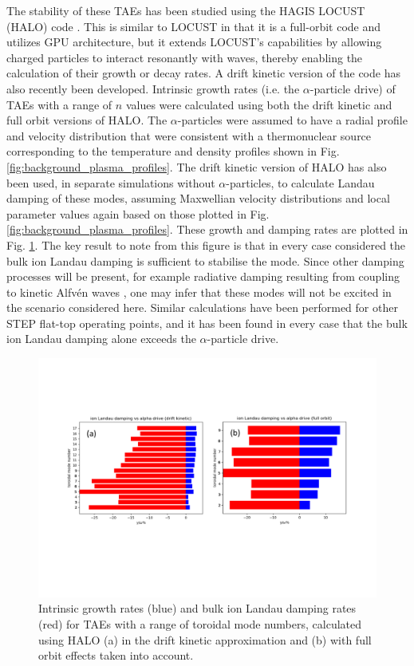 \documentclass[10pt, a4paper, twoside]{article}
\begin{document}
The stability of these TAEs has been studied using the HAGIS LOCUST (HALO) code \cite{fitzgerald2020}. This is similar to LOCUST in that it is a full-orbit code and utilizes GPU architecture, but it extends LOCUST's capabilities by allowing charged particles to interact resonantly with waves, thereby enabling the calculation of their growth or decay rates. A drift kinetic version of the code has also recently been developed. Intrinsic growth rates (i.e. the $\alpha$-particle drive) of TAEs with a range of $n$ values were calculated using both the drift kinetic and full orbit versions of HALO. The $\alpha$-particles were assumed to have a radial profile and velocity distribution that were consistent with a thermonuclear source corresponding to the temperature and density profiles shown in Fig. \ref{fig:background_plasma_profiles}. The drift kinetic version of HALO has also been used, in separate simulations without $\alpha$-particles, to calculate Landau damping of these modes, assuming Maxwellian velocity distributions and local parameter values again based on those plotted in Fig. \ref{fig:background_plasma_profiles}. These growth and damping rates are plotted in Fig. \ref{fig:TAE_growth_rates}. The key result to note from this figure is that in every case considered the bulk ion Landau damping is sufficient to stabilise the mode. Since other damping processes will be present, for example radiative damping resulting from coupling to kinetic Alfv\'en waves \cite{berk1993}, one may infer that these modes will not be excited in the scenario considered here. Similar calculations have been performed for other STEP flat-top operating points, and it has been found in every case that the bulk ion Landau damping alone exceeds the $\alpha$-particle drive.

\begin{figure}[htpb]
    \centering
    \vspace{-2.5cm}
    \includegraphics[width=1.0\linewidth]{Figures/TAE_figure2.pdf}
    \vspace{-4.0cm}
    \caption{Intrinsic growth rates (blue) and bulk ion Landau damping rates (red) for TAEs with a range of toroidal mode numbers, calculated using HALO (a) in the drift kinetic approximation and (b) with full orbit effects taken into account.}
    \label{fig:TAE_growth_rates}
\end{figure}
\end{document}
